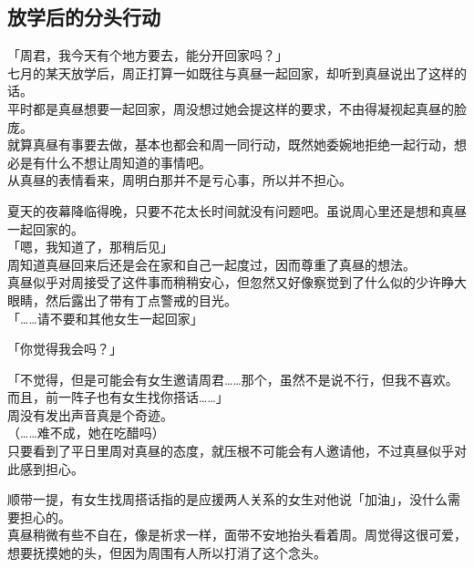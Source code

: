 \subsection{放学后的分头行动}

「周君，我今天有个地方要去，能分开回家吗？」\\

七月的某天放学后，周正打算一如既往与真昼一起回家，却听到真昼说出了这样的话。\\

平时都是真昼想要一起回家，周没想过她会提这样的要求，不由得凝视起真昼的脸庞。\\

就算真昼有事要去做，基本也都会和周一同行动，既然她委婉地拒绝一起行动，想必是有什么不想让周知道的事情吧。\\

从真昼的表情看来，周明白那并不是亏心事，所以并不担心。

夏天的夜幕降临得晚，只要不花太长时间就没有问题吧。虽说周心里还是想和真昼一起回家的。\\

「嗯，我知道了，那稍后见」\\

周知道真昼回来后还是会在家和自己一起度过，因而尊重了真昼的想法。\\

真昼似乎对周接受了这件事而稍稍安心，但忽然又好像察觉到了什么似的少许睁大眼睛，然后露出了带有丁点警戒的目光。\\

「……请不要和其他女生一起回家」

「你觉得我会吗？」

「不觉得，但是可能会有女生邀请周君……那个，虽然不是说不行，但我不喜欢。而且，前一阵子也有女生找你搭话……」\\

周没有发出声音真是个奇迹。\\

（……难不成，她在吃醋吗）\\

只要看到了平日里周对真昼的态度，就压根不可能会有人邀请他，不过真昼似乎对此感到担心。

顺带一提，有女生找周搭话指的是应援两人关系的女生对他说「加油」，没什么需要担心的。\\

真昼稍微有些不自在，像是祈求一样，面带不安地抬头看着周。周觉得这很可爱，想要抚摸她的头，但因为周围有人所以打消了这个念头。\\

